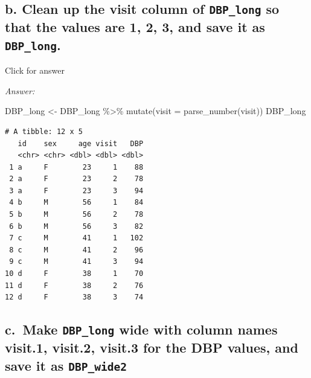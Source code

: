\documentclass[
]{book}
\newenvironment{Shaded}{\begin{snugshade}}{\end{snugshade}}
\newcommand{\AttributeTok}[1]{\textcolor[rgb]{0.77,0.63,0.00}{#1}}
\newcommand{\FunctionTok}[1]{\textcolor[rgb]{0.00,0.00,0.00}{#1}}
\newcommand{\NormalTok}[1]{#1}
\newcommand{\OtherTok}[1]{\textcolor[rgb]{0.56,0.35,0.01}{#1}}
\newcommand{\SpecialCharTok}[1]{\textcolor[rgb]{0.00,0.00,0.00}{#1}}
\begin{document}
\hypertarget{b.-clean-up-the-visit-column-of-dbp_long-so-that-the-values-are-1-2-3-and-save-it-as-dbp_long.}{%
\subsection{\texorpdfstring{b. Clean up the visit column of \texttt{DBP\_long} so that the values are 1, 2, 3, and save it as \texttt{DBP\_long}.}{b. Clean up the visit column of DBP\_long so that the values are 1, 2, 3, and save it as DBP\_long.}}\label{b.-clean-up-the-visit-column-of-dbp_long-so-that-the-values-are-1-2-3-and-save-it-as-dbp_long.}}

Click for answer

\emph{Answer:}

\begin{Shaded}
\begin{Highlighting}[]
\NormalTok{DBP\_long }\OtherTok{\textless{}{-}}\NormalTok{ DBP\_long }\SpecialCharTok{\%\textgreater{}\%}
  \FunctionTok{mutate}\NormalTok{(}\AttributeTok{visit =} \FunctionTok{parse\_number}\NormalTok{(visit))}
\NormalTok{DBP\_long}
\end{Highlighting}
\end{Shaded}

\begin{verbatim}
# A tibble: 12 x 5
   id    sex     age visit   DBP
   <chr> <chr> <dbl> <dbl> <dbl>
 1 a     F        23     1    88
 2 a     F        23     2    78
 3 a     F        23     3    94
 4 b     M        56     1    84
 5 b     M        56     2    78
 6 b     M        56     3    82
 7 c     M        41     1   102
 8 c     M        41     2    96
 9 c     M        41     3    94
10 d     F        38     1    70
11 d     F        38     2    76
12 d     F        38     3    74
\end{verbatim}

\hypertarget{c.-make-dbp_long-wide-with-column-names-visit.1-visit.2-visit.3-for-the-dbp-values-and-save-it-as-dbp_wide2}{%
\subsection{\texorpdfstring{c.~Make \texttt{DBP\_long} wide with column names visit.1, visit.2, visit.3 for the DBP values, and save it as \texttt{DBP\_wide2}}{c.~Make DBP\_long wide with column names visit.1, visit.2, visit.3 for the DBP values, and save it as DBP\_wide2}}\label{c.-make-dbp_long-wide-with-column-names-visit.1-visit.2-visit.3-for-the-dbp-values-and-save-it-as-dbp_wide2}}
\end{document}
